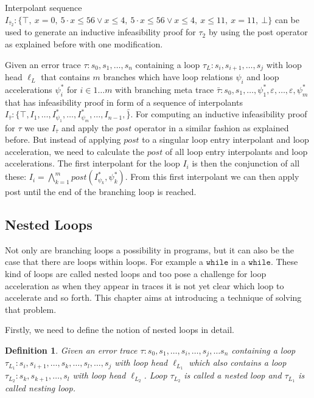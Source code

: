 \documentclass{article}
\newcounter{example}[section]
\newtheorem{mydef}{Definition}
\begin{document}
Interpolant sequence $I_{\bar{\tau}_2}: \{ \top,\ x = 0,\ 5 \cdot x \leq 56 \lor x \leq 4,\ 5 \cdot x \leq 56 \lor x \leq 4,\ x \leq 11,\ x = 11,\ \bot\}$ can be used to generate an inductive infeasibility proof for $\tau_2$ by using the post operator as explained before with one modification. \\ \par
Given an error trace $\tau: s_0, s_1, \ldots, s_n$ containing a loop $\tau_L: s_i, s_{i+1}, \ldots, s_j$ with loop head $\ell_L$ that contains $m$ branches which have loop relations $\psi_i$ and loop accelerations $\psi_{i}^*$ for $i \in 1 \ldots m$ with branching meta trace $\bar{\tau}: s_0, s_1, \ldots, \psi_{1}^*, \varepsilon, \ldots, \varepsilon, \psi_{m}^*$ that has infeasibility proof in form of a sequence of interpolants $I_{\bar{\tau}}: \{\top, I_1, \ldots, I_{\psi_{1}}^*, \ldots, I_{\psi_{m}}^*, \ldots, I_{n - 1}, \bar \}$. For computing an inductive infeasibility proof for $\tau$ we use $I_{\bar{\tau}}$ and apply the $post$ operator in a similar fashion as explained before. But instead of applying $post$ to a singular loop entry interpolant and loop acceleration, we need to calculate the $post$ of all loop entry interpolants and loop accelerations. The first interpolant for the loop $I_i$ is then the conjunction of all these: $I_i = \bigwedge_{k=1}^{m} post(I_{\psi_k}^*, \psi_k^*)$. From this first interpolant we can then apply post until the end of the branching loop is reached.


\subsection{Nested Loops}
Not only are branching loops a possibility in programs, but it can also be the case that there are loops within loops. For example a $\texttt{while}$ in a $\texttt{while}$. These kind of loops are called nested loops and too pose a challenge for loop acceleration as when they appear in traces it is not yet clear which loop to accelerate and so forth. This chapter aims at introducing a technique of solving that problem. \\ \par

Firstly, we need to define the notion of nested loops in detail.
\begin{mydef}
    Given an error trace $\tau: s_0, s_1, \ldots, s_i, \ldots, s_j, \ldots s_n$ containing a loop \\ $\tau_{L_1}: s_i, s_{i+1}, \ldots, s_k, \ldots, s_l, \ldots, s_j$ with loop head $\ell_{L_1}$ which also contains a loop $\tau_{L_2}: s_k, s_{k+1}, \ldots, s_l$ with loop head $\ell_{L_2}$.
    Loop $\tau_{L_2}$ is called a nested loop and $\tau_{L_1}$ is called nesting loop.
\end{mydef}
\end{document}
